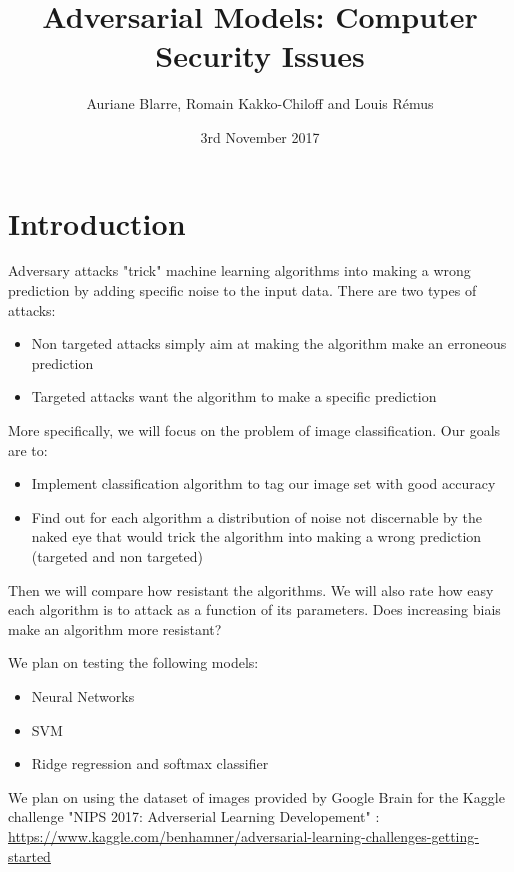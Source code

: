 \documentclass{article}
\title{Adversarial Models: Computer Security Issues}
\author{Auriane Blarre, Romain Kakko-Chiloff and Louis R\'emus}
\date{3rd November 2017}
\begin{document}
\maketitle

\section{Introduction}
Adversary attacks "trick" machine learning algorithms into making a wrong prediction by adding specific noise to the input data. There are two types of attacks:

\begin{itemize}
    \item Non targeted attacks simply aim at making the algorithm make an erroneous prediction
    \item Targeted attacks want the algorithm to make a specific prediction
\end{itemize}

More specifically, we will focus on the problem of image classification. Our goals are to:

\begin{itemize}
    \item Implement classification algorithm to tag our image set with good accuracy
    \item Find out for each algorithm a distribution of noise not discernable by the naked eye that would trick the algorithm into making a wrong prediction (targeted and non targeted)
\end{itemize}

Then we will compare how resistant the algorithms. We will also rate how easy each algorithm is to attack as a function of its parameters. Does increasing biais make an algorithm more resistant?


We plan on testing the following models:

\begin{itemize}
    \item Neural Networks
    \item SVM
    \item Ridge regression and softmax classifier
\end{itemize}

We plan on using the dataset of images provided by Google Brain for the Kaggle challenge "NIPS 2017: Adverserial Learning Developement" :
\newline
\url{https://www.kaggle.com/benhamner/adversarial-learning-challenges-getting-started}
\end{document}
